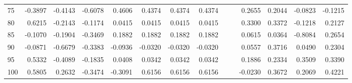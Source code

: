 \begin{tabular}{lrrrrrrrrrrrrr}
75  &         -0.3897 &      -0.4143 &     -0.6078 &         0.4606 &        0.4374 &        0.4374 &        0.4374 &               &               &    0.2655 &      0.2044 &    -0.0823 &       -0.1215 \\
80  &          0.6215 &      -0.2143 &     -0.1174 &         0.0415 &        0.0415 &        0.0415 &        0.0415 &               &               &    0.3300 &      0.3372 &    -0.1218 &        0.2127 \\
85  &         -0.1070 &      -0.1904 &     -0.3469 &         0.1882 &        0.1882 &        0.1882 &        0.1882 &               &               &    0.0615 &      0.0364 &    -0.8084 &        0.2654 \\
90  &         -0.0871 &      -0.6679 &     -0.3383 &        -0.0936 &       -0.0320 &       -0.0320 &       -0.0320 &               &               &    0.0557 &      0.3716 &     0.0490 &        0.2304 \\
95  &          0.5332 &      -0.4089 &     -0.1835 &         0.0408 &        0.0342 &        0.0342 &        0.0342 &               &               &    0.1886 &      0.2334 &     0.3509 &        0.3390 \\
100 &          0.5805 &       0.2632 &     -0.3474 &        -0.3091 &        0.6156 &        0.6156 &        0.6156 &               &               &   -0.0230 &      0.3672 &     0.2069 &        0.4221 \\
\bottomrule
\end{tabular}
